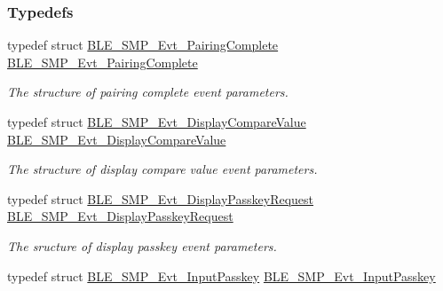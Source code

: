 \subsubsection*{Typedefs}
\begin{DoxyCompactItemize}
\item 
typedef struct \hyperlink{struct_b_l_e___s_m_p___evt___pairing_complete}{B\+L\+E\+\_\+\+S\+M\+P\+\_\+\+Evt\+\_\+\+Pairing\+Complete} \hyperlink{group___b_l_e___s_m_p_ga3f5417c8d4ce0d3850cbb6a7456b2005}{B\+L\+E\+\_\+\+S\+M\+P\+\_\+\+Evt\+\_\+\+Pairing\+Complete}\hypertarget{group___b_l_e___s_m_p_ga3f5417c8d4ce0d3850cbb6a7456b2005}{}\label{group___b_l_e___s_m_p_ga3f5417c8d4ce0d3850cbb6a7456b2005}

\begin{DoxyCompactList}\small\item\em The structure of pairing complete event parameters. \end{DoxyCompactList}\item 
typedef struct \hyperlink{struct_b_l_e___s_m_p___evt___display_compare_value}{B\+L\+E\+\_\+\+S\+M\+P\+\_\+\+Evt\+\_\+\+Display\+Compare\+Value} \hyperlink{group___b_l_e___s_m_p_ga62683d3626214f55e7f250032bc1cd1b}{B\+L\+E\+\_\+\+S\+M\+P\+\_\+\+Evt\+\_\+\+Display\+Compare\+Value}\hypertarget{group___b_l_e___s_m_p_ga62683d3626214f55e7f250032bc1cd1b}{}\label{group___b_l_e___s_m_p_ga62683d3626214f55e7f250032bc1cd1b}

\begin{DoxyCompactList}\small\item\em The structure of display compare value event parameters. \end{DoxyCompactList}\item 
typedef struct \hyperlink{struct_b_l_e___s_m_p___evt___display_passkey_request}{B\+L\+E\+\_\+\+S\+M\+P\+\_\+\+Evt\+\_\+\+Display\+Passkey\+Request} \hyperlink{group___b_l_e___s_m_p_ga61c500bade77af36588f579da582a9e5}{B\+L\+E\+\_\+\+S\+M\+P\+\_\+\+Evt\+\_\+\+Display\+Passkey\+Request}\hypertarget{group___b_l_e___s_m_p_ga61c500bade77af36588f579da582a9e5}{}\label{group___b_l_e___s_m_p_ga61c500bade77af36588f579da582a9e5}

\begin{DoxyCompactList}\small\item\em The sructure of display passkey event parameters. \end{DoxyCompactList}\item 
typedef struct \hyperlink{struct_b_l_e___s_m_p___evt___input_passkey}{B\+L\+E\+\_\+\+S\+M\+P\+\_\+\+Evt\+\_\+\+Input\+Passkey} \hyperlink{group___b_l_e___s_m_p_gaabf83e81e6a5c2ed18a496320bfe0ff2}{B\+L\+E\+\_\+\+S\+M\+P\+\_\+\+Evt\+\_\+\+Input\+Passkey}\hypertarget{group___b_l_e___s_m_p_gaabf83e81e6a5c2ed18a496320bfe0ff2}{}\label{group___b_l_e___s_m_p_gaabf83e81e6a5c2ed18a496320bfe0ff2}


\end{DoxyCompactItemize}
